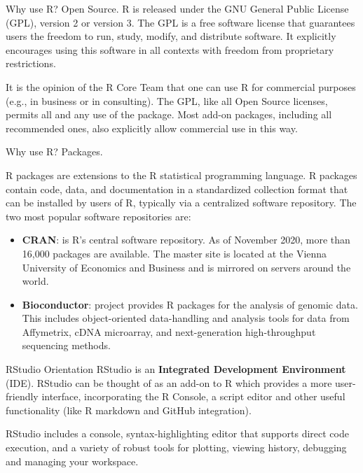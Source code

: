 \documentclass[aspectratio=169,xcolor=dvipsnames]{beamer}
\begin{document}
\begin{frame}{Why use R? Open Source.}
R is released under the GNU General Public License (GPL), version 2 or version 3. The GPL is a free software license that guarantees users the freedom to run, study, modify, and distribute software. It explicitly encourages using this software in all contexts with freedom from proprietary restrictions.

\vspace{.5cm}

It is the opinion of the R Core Team that one can use R for commercial purposes (e.g., in business or in consulting). The GPL, like all Open Source licenses, permits all and any use of the package. Most add-on packages, including all recommended ones, also explicitly allow commercial use in this way. 

\end{frame}



\begin{frame}{Why use R? Packages.}

R packages are extensions to the R statistical programming language. R packages contain code, data, and documentation in a standardized collection format that can be installed by users of R, typically via a centralized software repository. The two most popular software repositories are:
\vspace{0.25cm}
\begin{itemize}
	\item \textbf{CRAN}: is R's central software repository. As of November 2020, more than 16,000 packages are available. The master site is located at the Vienna University of Economics and Business and is mirrored on servers around the world.
	\item \textbf{Bioconductor}: project provides R packages for the analysis of genomic data. This includes object-oriented data-handling and analysis tools for data from Affymetrix, cDNA microarray, and next-generation high-throughput sequencing methods.
\end{itemize}
\end{frame}


\begin{frame}{RStudio Orientation}
RStudio is an \textbf{Integrated Development Environment} (IDE). RStudio can be thought of as an add-on to R which provides a more user-friendly interface, incorporating the R Console, a script editor and other useful functionality (like R markdown and GitHub integration).

\vspace{0.5cm}

RStudio includes a console, syntax-highlighting editor that supports direct code execution, and a variety of robust tools for plotting, viewing history, debugging and managing your workspace.
\end{frame}
\end{document}
